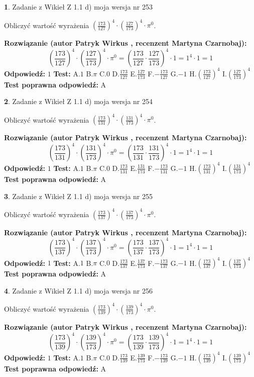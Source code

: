 \documentclass[12pt, a4paper]{article}
\theoremstyle{definition} %
\newtheorem{zad}{}
\newcommand{\zadStart}[1]{\begin{zad}#1\newline}
\newcommand{\zadStop}{\end{zad}}
\newcommand{\rozwStart}[2]{\noindent \textbf{Rozwiązanie (autor #1 , recenzent #2): }\newline}
\newcommand{\rozwStop}{\newline}
\newcommand{\odpStart}{\noindent \textbf{Odpowiedź:}\newline}
\newcommand{\odpStop}{\newline}
\newcommand{\testStart}{\noindent \textbf{Test:}\newline}
\newcommand{\testStop}{\newline}
\newcommand{\kluczStart}{\noindent \textbf{Test poprawna odpowiedź:}\newline}
\newcommand{\kluczStop}{\newline}
\begin{document}
\zadStart{Zadanie z Wikieł Z 1.1 d) moja wersja nr 253}

Obliczyć wartość wyrażenia $(\frac{173}{127})^{4} \cdot (\frac{127}{173})^{4} \cdot \pi^{0}$.
\zadStop
\rozwStart{Patryk Wirkus}{Martyna Czarnobaj}
$$(\frac{173}{127})^{4} \cdot (\frac{127}{173})^{4} \cdot \pi^{0} = (\frac{173}{127} \cdot \frac{127}{173})^{4} \cdot 1 = 1^{4} \cdot 1 = 1$$
\rozwStop
\odpStart
$1$
\odpStop
\testStart
A.$1$ B.$\pi$ C.$0$ D.$\frac{173}{127}$ E.$\frac{127}{173}$
F.$-\frac{173}{127}$ G.$-1$
H.$(\frac{173}{127})^{4}$
I.$(\frac{127}{173})^{4}$
\testStop
\kluczStart
A
\kluczStop



\zadStart{Zadanie z Wikieł Z 1.1 d) moja wersja nr 254}

Obliczyć wartość wyrażenia $(\frac{173}{131})^{4} \cdot (\frac{131}{173})^{4} \cdot \pi^{0}$.
\zadStop
\rozwStart{Patryk Wirkus}{Martyna Czarnobaj}
$$(\frac{173}{131})^{4} \cdot (\frac{131}{173})^{4} \cdot \pi^{0} = (\frac{173}{131} \cdot \frac{131}{173})^{4} \cdot 1 = 1^{4} \cdot 1 = 1$$
\rozwStop
\odpStart
$1$
\odpStop
\testStart
A.$1$ B.$\pi$ C.$0$ D.$\frac{173}{131}$ E.$\frac{131}{173}$
F.$-\frac{173}{131}$ G.$-1$
H.$(\frac{173}{131})^{4}$
I.$(\frac{131}{173})^{4}$
\testStop
\kluczStart
A
\kluczStop



\zadStart{Zadanie z Wikieł Z 1.1 d) moja wersja nr 255}

Obliczyć wartość wyrażenia $(\frac{173}{137})^{4} \cdot (\frac{137}{173})^{4} \cdot \pi^{0}$.
\zadStop
\rozwStart{Patryk Wirkus}{Martyna Czarnobaj}
$$(\frac{173}{137})^{4} \cdot (\frac{137}{173})^{4} \cdot \pi^{0} = (\frac{173}{137} \cdot \frac{137}{173})^{4} \cdot 1 = 1^{4} \cdot 1 = 1$$
\rozwStop
\odpStart
$1$
\odpStop
\testStart
A.$1$ B.$\pi$ C.$0$ D.$\frac{173}{137}$ E.$\frac{137}{173}$
F.$-\frac{173}{137}$ G.$-1$
H.$(\frac{173}{137})^{4}$
I.$(\frac{137}{173})^{4}$
\testStop
\kluczStart
A
\kluczStop



\zadStart{Zadanie z Wikieł Z 1.1 d) moja wersja nr 256}

Obliczyć wartość wyrażenia $(\frac{173}{139})^{4} \cdot (\frac{139}{173})^{4} \cdot \pi^{0}$.
\zadStop
\rozwStart{Patryk Wirkus}{Martyna Czarnobaj}
$$(\frac{173}{139})^{4} \cdot (\frac{139}{173})^{4} \cdot \pi^{0} = (\frac{173}{139} \cdot \frac{139}{173})^{4} \cdot 1 = 1^{4} \cdot 1 = 1$$
\rozwStop
\odpStart
$1$
\odpStop
\testStart
A.$1$ B.$\pi$ C.$0$ D.$\frac{173}{139}$ E.$\frac{139}{173}$
F.$-\frac{173}{139}$ G.$-1$
H.$(\frac{173}{139})^{4}$
I.$(\frac{139}{173})^{4}$
\testStop
\kluczStart
A
\kluczStop
\end{document}
